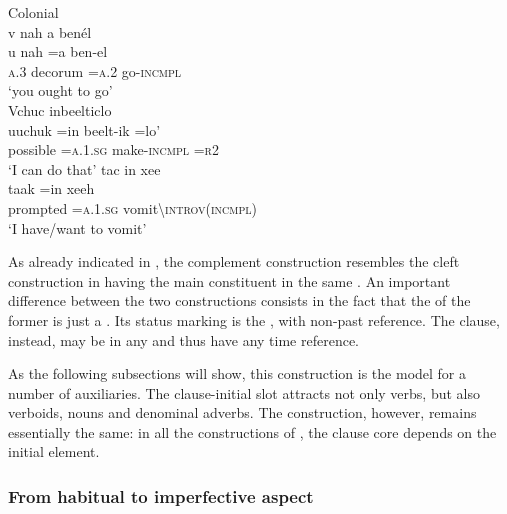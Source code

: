 \documentclass[output=paper]{langsci/langscibook}
\begin{document}
\ea\label{ex:lehmann:23}
Colonial  \\
\ea 
v    nah      a      benél\\
\gll   u    nah      =a    ben-el\\
\textsc{a.3}  decorum\rmfnm{} =\textsc{a.2}   go-\textsc{incmpl}\\
\glt ‘you ought to go’ \citep[69]{Coronel1620}\\
\ex 
Vchuc    inbeelticlo\\
\gll   uuchuk  =in      beelt-ik      =lo'\\
possible  =\textsc{a.1.sg}    make-\textsc{incmpl}   \textsc{=r2}\\
\glt ‘I can do that’ \citep[18v]{SanBuenaventura1684}\newpage
\ex 
tac       in       xee\\
\gll   taak      =in      xeeh\\
prompted  =\textsc{a.1.sg}   vomit{\textbackslash}\textsc{introv(incmpl)}\\
\glt ‘I have/want to vomit’ \citep[§299, p.146]{Beltrán1746} 
\z
\z 

As already indicated in , the complement construction resembles the cleft construction in having the main constituent in the same . An important difference between the two constructions consists in the fact that the  of the former is just a . Its status marking is the  , with non-past reference. The  clause, instead, may be in any  and thus have any time reference.


As the following subsections will show, this construction is the model for a number of auxiliaries. The clause-initial slot attracts not only  verbs, but also verboids, nouns and denominal adverbs. The construction, however, remains essentially the same: in all the constructions of , the clause core depends on the initial element.


\subsubsection{From habitual to imperfective aspect}\label{sec:lehmann:4.7.2}
\end{document}
